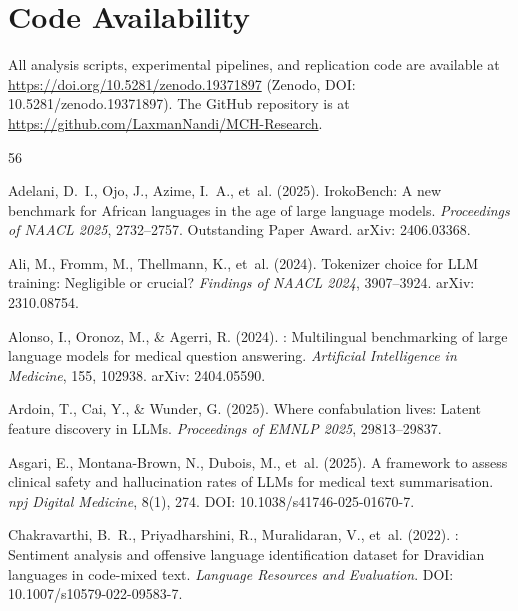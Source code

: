 \documentclass[11pt,a4paper]{article}
\begin{document}
\section*{Code Availability}
All analysis scripts, experimental pipelines, and replication code are available at \url{https://doi.org/10.5281/zenodo.19371897} (Zenodo, DOI: 10.5281/zenodo.19371897). The GitHub repository is at \url{https://github.com/LaxmanNandi/MCH-Research}.



\begin{thebibliography}{56}

Adelani, D.~I., Ojo, J., Azime, I.~A., et~al. (2025).
\newblock IrokoBench: A new benchmark for African languages in the age of large language models.
\newblock \emph{Proceedings of NAACL 2025}, 2732--2757. Outstanding Paper Award.
\newblock arXiv: 2406.03368.

Ali, M., Fromm, M., Thellmann, K., et~al. (2024).
\newblock Tokenizer choice for {LLM} training: Negligible or crucial?
\newblock \emph{Findings of NAACL 2024}, 3907--3924.
\newblock arXiv: 2310.08754.

Alonso, I., Oronoz, M., \& Agerri, R. (2024).
: Multilingual benchmarking of large language models for medical question answering.
\newblock \emph{Artificial Intelligence in Medicine}, 155, 102938.
\newblock arXiv: 2404.05590.

Ardoin, T., Cai, Y., \& Wunder, G. (2025).
\newblock Where confabulation lives: Latent feature discovery in {LLMs}.
\newblock \emph{Proceedings of EMNLP 2025}, 29813--29837.

Asgari, E., Montana-Brown, N., Dubois, M., et~al. (2025).
\newblock A framework to assess clinical safety and hallucination rates of {LLMs} for medical text summarisation.
\newblock \emph{npj Digital Medicine}, 8(1), 274.
\newblock DOI: 10.1038/s41746-025-01670-7.

Chakravarthi, B.~R., Priyadharshini, R., Muralidaran, V., et~al. (2022).
: Sentiment analysis and offensive language identification dataset for {D}ravidian languages in code-mixed text.
\newblock \emph{Language Resources and Evaluation}.
\newblock DOI: 10.1007/s10579-022-09583-7.


\end{thebibliography}
\end{document}
